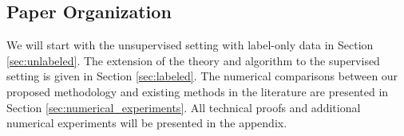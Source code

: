 


%



\subsection{Paper Organization}

We will start with the unsupervised setting with label-only data in Section \ref{sec:unlabeled}. The extension of the theory and algorithm to the supervised setting is given in Section \ref{sec:labeled}. The numerical comparisons between our proposed methodology and existing methods in the literature are presented in Section \ref{sec:numerical_experiments}. All technical proofs and additional numerical experiments will be presented in the appendix.